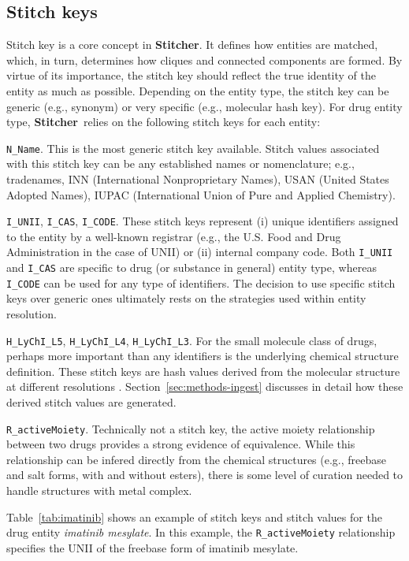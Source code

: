 \documentclass{bioinfo}
\newcommand\st{\textbf{Stitcher}}
\begin{document}
\subsection{Stitch keys}
Stitch key is a core concept in \st. It defines how entities are matched, which, in turn, determines how cliques and connected components are formed. By virtue of its importance, the stitch key should reflect the true identity of the entity as much as possible. Depending on the entity type, the stitch key can be generic (e.g., synonym) or very specific (e.g., molecular hash key). For drug entity type, \st\ relies on the following stitch keys for each entity:
\begin{unlist}
\item{\texttt{N\_Name}.} This is the most generic stitch key available. Stitch values associated with this stitch key can be any established names or nomenclature; e.g., tradenames, INN (International Nonproprietary Names), USAN (United States Adopted Names), IUPAC (International Union of Pure and Applied Chemistry).
\item{\texttt{I\_UNII}, \texttt{I\_CAS}, \texttt{I\_CODE}.} These stitch keys represent (i) unique identifiers assigned to the entity by a well-known registrar (e.g., the U.S. Food and Drug Administration in the case of UNII) or (ii) internal company code. Both \texttt{I\_UNII} and \texttt{I\_CAS} are specific to drug (or substance in general) entity type, whereas \texttt{I\_CODE} can be used for any type of identifiers. The decision to use specific stitch keys over generic ones ultimately rests on the strategies used within entity resolution.
\item{\texttt{H\_LyChI\_L5}, \texttt{H\_LyChI\_L4}, \texttt{H\_LyChI\_L3}.} For the small molecule class of drugs, perhaps more important than any identifiers is the underlying chemical structure definition. These stitch keys are hash values derived from the molecular structure at different resolutions \citep{lychi2019}. Section~\ref{sec:methods-ingest} discusses in detail how these derived stitch values are generated.
\item{\texttt{R\_activeMoiety}.} Technically not a stitch key, the active moiety relationship between two drugs provides a strong evidence of equivalence. While this relationship can be infered directly from the chemical structures (e.g., freebase and salt forms, with and without esters), there is some level of curation needed to handle structures with metal complex.
\end{unlist}
Table~\ref{tab:imatinib} shows an example of stitch keys and stitch values for
the drug entity \emph{imatinib mesylate}. In this example, the \texttt{R\_activeMoiety} relationship specifies the UNII of the freebase form of imatinib mesylate.
\end{document}
